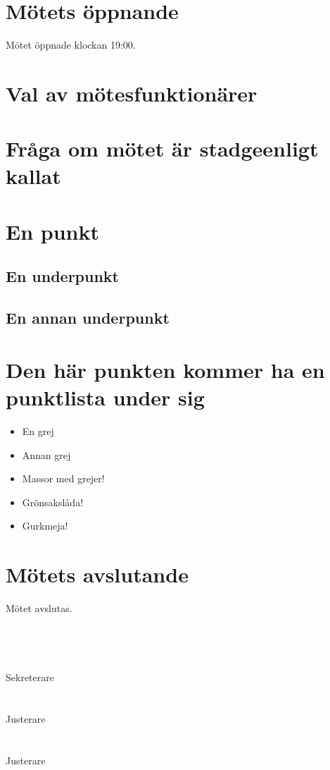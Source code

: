 \documentclass[a4paper,11pt,oneside]{article}
\begin{document}
\section{Mötets öppnande}
Mötet öppnade klockan 19:00.

\section{Val av mötesfunktionärer}

\section{Fråga om mötet är stadgeenligt kallat}

\section{En punkt}
\subsection{En underpunkt}

\subsection{En annan underpunkt}

\section{Den här punkten kommer ha en punktlista under sig}
\begin{itemize}
\item{En grej}
\item{Annan grej}
\item{Massor med grejer!}
\item{Grönsakslåda!}
\item{Gurkmeja!}
\end{itemize}

\section{Mötets avslutande}
Mötet avslutas.
\\
\\
\\
\\
\\
Sekreterare\hspace{0.2cm} \makebox[3in]{\hrulefill}\\\\\\
Justerare\hspace{0.5cm} \makebox[3in]{\hrulefill}\\\\\\
Justerare\hspace{0.5cm} \makebox[3in]{\hrulefill}\\
\end{document}
